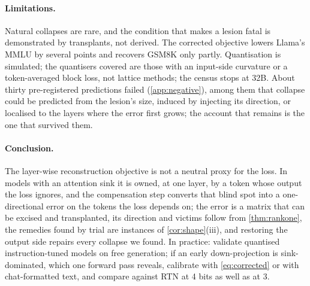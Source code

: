 \paragraph{Limitations.}
Natural collapses are rare, and the condition that makes a lesion fatal is demonstrated by transplants, not derived.
The corrected objective lowers Llama's MMLU by several points and recovers GSM8K only partly.
Quantisation is simulated; the quantisers covered are those with an input-side curvature or a token-averaged block loss, not lattice methods; the census stops at 32B.
About thirty pre-registered predictions failed (\cref{app:negative}), among them that collapse could be predicted from the lesion's size, induced by injecting its direction, or localised to the layers where the error first grows; the account that remains is the one that survived them.

\paragraph{Conclusion.}
The layer-wise reconstruction objective is not a neutral proxy for the loss.
In models with an attention sink it is owned, at one layer, by a token whose output the loss ignores, and the compensation step converts that blind spot into a one-directional error on the tokens the loss depends on; the error is a matrix that can be excised and transplanted, its direction and victims follow from \cref{thm:rankone}, the remedies found by trial are instances of \cref{cor:shape}(iii), and restoring the output side repairs every collapse we found.
In practice: validate quantised instruction-tuned models on free generation; if an early down-projection is sink-dominated, which one forward pass reveals, calibrate with \cref{eq:corrected} or with chat-formatted text, and compare against RTN at 4 bits as well as at 3.
